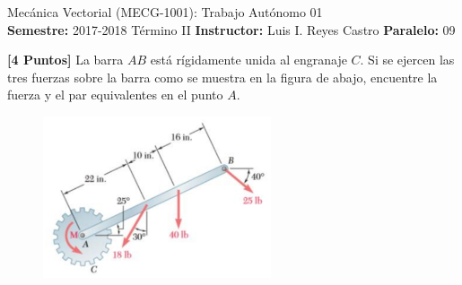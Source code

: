 \documentclass[ a4paper, twoside, 11pt]{article}
\newcommand{\numero}{01}
\begin{document}
\allowdisplaybreaks

\begin{center}
\Large Mec\'anica Vectorial (MECG-1001): Trabajo Aut\'onomo \numero \\[2ex]
\small \textbf{Semestre:} 2017-2018 T\'ermino II \qquad
\textbf{Instructor:} Luis I. Reyes Castro \qquad
\textbf{Paralelo:} 09
\end{center}
\fullskip

\begin{problem}
\textbf{[4 Puntos]} La barra $AB$ est\'a r\'igidamente unida al engranaje $C$. Si se ejercen las tres fuerzas sobre la barra como se muestra en la figura de abajo, encuentre la fuerza y el par equivalentes en el punto $A$. 

\begin{figure}[htb]
\centering
\includegraphics[width=0.6\textwidth]{problema.jpg}
\end{figure}

\end{problem}
\vspace{\baselineskip}
\end{document}
